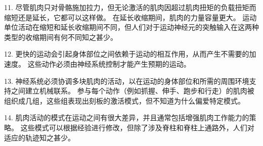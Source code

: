 11. 尽管肌肉只对骨骼施加拉力，但无论激活的肌肉因超过肌肉扭矩的负载扭矩而缩短还是延长，它都可以这样做。
在延长收缩期间，肌肉的力量容量更大。
运动单位活动在缩短和延长收缩期间不同，但人们对于运动神经元的突触输入在这两种类型的收缩期间有何不同知之甚少。


12. 更快的运动会引起身体部位之间依赖于运动的相互作用，从而产生不需要的加速度。
这些动作必须由神经系统控制才能产生预期的运动。


13. 神经系统必须协调多块肌肉的活动，以在运动的身体部位和所需的周围环境支持之间建立机械联系。
参与每个动作（例如抓握、伸手、跑步和行走）的肌肉被组织成几组，这些组表现出刻板的激活模式，但不知道为什么偏爱特定模式。


14. 肌肉活动的模式在运动之间有很大差异，并且通常包括增强肌肉工作能力的策略。
这些模式可以根据经验进行修改，但除了涉及脊柱和脊柱上通路外，人们对适应的轨迹知之甚少。



